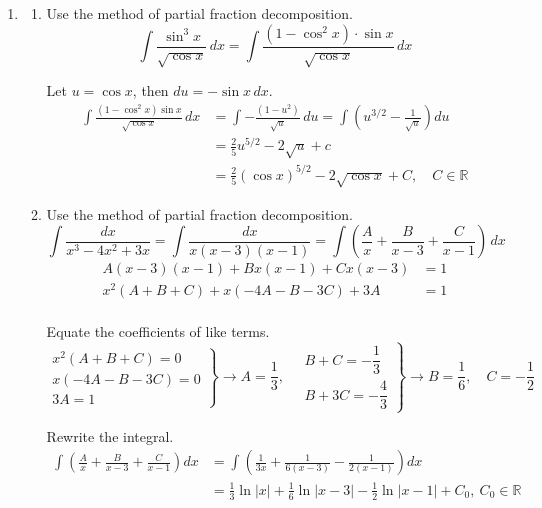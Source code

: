 \documentclass[a4paper, 12pt]{article}
\renewcommand{\headrulewidth}{0pt}
\begin{document}
\newpage
\pagestyle{fancy}
\renewcommand{\headrulewidth}{1pt}


\begin{enumerate}[leftmargin=*,label=\textbf{\arabic*.}]
\item \begin{enumerate}[leftmargin=*,label=\textbf{\alph*.}]
\item Use the method of partial fraction decomposition.
\[\int\frac{\sin^3x}{\sqrt{\cos x}}\,dx=\int\frac{\left(1-\cos^2x\right)\cdot\sin x}{\sqrt{\cos x}}\,dx\]

Let $u=\cos x$, then $du=-\sin x\,dx$.
\begin{align*}
\int\frac{\left(1-\cos^2x\right)\sin x}{\sqrt{\cos x}}\,dx
&=\int-\frac{\left(1-u^2\right)}{\sqrt{u}}\,du
=\int\left(u^{3/2}-\frac1{\sqrt u}\right)du
\\[1em]
&=\frac25u^{5/2}-2\sqrt u+c\\[1em]
&=\boxed{\frac25\left(\cos x\right)^{5/2}-2\sqrt{\cos x}+C,\quad C\in\mathbb{R}}
\end{align*}

\item Use the method of partial fraction decomposition.
\[\int\frac{dx}{x^3-4x^2+3x}=\int\frac{dx}{x(x-3)(x-1)}=\int\left(\frac Ax+\frac B{x-3}+\frac C{x-1}\right)\,dx\]
\[\begin{array}{rc}
A(x-3)(x-1)+Bx(x-1)+Cx(x-3)&=1\\
x^2(A+B+C)+x(-4A-B-3C)+3A&=1\\
&
\end{array}\]

Equate the coefficients of like terms.
\[\left.\begin{array}{r}
x^2(A+B+C)=0\\
x(-4A-B-3C)=0\\
3A=1
\end{array}\right\}\rightarrow A=\frac13,\quad
\left.\begin{array}{r}
B+C=-\dfrac13\\[1em]
B+3C=-\dfrac43
\end{array}\right\}\rightarrow B=\frac16,\quad C=-\frac12\]

Rewrite the integral.
\begin{align*}
\int\left(\frac Ax+\frac B{x-3}+\frac C{x-1}\right)dx
&=\int\left(\frac1{3x}+\frac1{6(x-3)}-\frac1{2(x-1)}\right)dx\\[1em]
&=\boxed{\frac13\ln|x|+\frac16\ln|x-3|-\frac12\ln|x-1|+C_0,\:C_0\in\mathbb{R}}
\end{align*}


\end{enumerate}
\end{enumerate}
\end{document}
